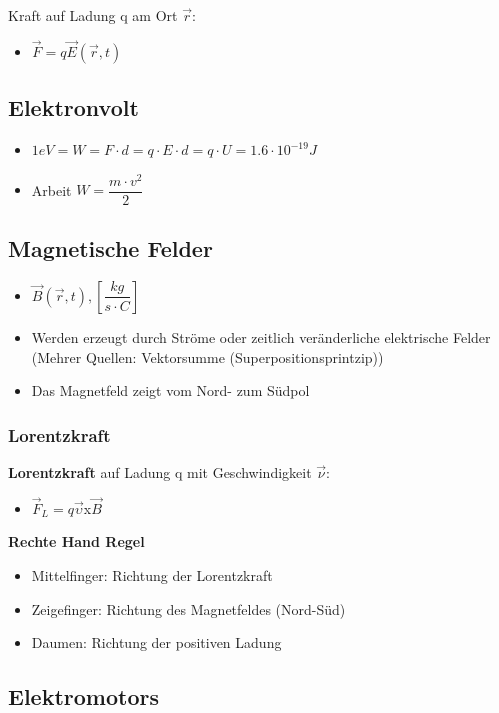 \documentclass[6pt,a4paper]{scrartcl}
\begin{document}
\begin{multicols*}{4}
\begin{itemize}
				\end{itemize}
				Kraft auf Ladung q am Ort 
				$\overrightarrow{r}$:
				\begin{itemize}\itemsep0pt
					\item $\overrightarrow{F}=q\overrightarrow{E}(\overrightarrow{r},t)$
				\end{itemize}
			\subsection{Elektronvolt}
				\begin{itemize}\itemsep0pt
					\item $1 eV = W = F \cdot d =q\cdot E\cdot d=q \cdot U= 1.6\cdot10^{-19}J$
					\item Arbeit $W=\dfrac{m\cdot v^{2}}{2}$
				\end{itemize}
			\subsection{Magnetische Felder}
				\begin{itemize}\itemsep0pt
					\item $\overrightarrow{B}(\overrightarrow{r},t), [\dfrac{kg}{s\cdot C}]$
					\item Werden erzeugt durch Ströme oder zeitlich veränderliche elektrische Felder (Mehrer Quellen: Vektorsumme (Superpositionsprintzip))
					\item Das Magnetfeld zeigt vom Nord- zum Südpol
				\end{itemize}
				
				\subsubsection{Lorentzkraft}				
				
					\textbf{Lorentzkraft} auf Ladung q mit Geschwindigkeit $\overrightarrow{\nu}$:
					\begin{itemize}\itemsep0pt
						\item $\overrightarrow{F}_{L}=q\overrightarrow{\upsilon} $x$ \overrightarrow{B}$
					\end{itemize}	
					
					\textbf{Rechte Hand Regel}
					\begin{itemize}\itemsep0pt
						\item Mittelfinger: Richtung der Lorentzkraft
						\item Zeigefinger: Richtung des Magnetfeldes (Nord-Süd)
						\item Daumen: Richtung der positiven Ladung
					\end{itemize}					
				
			\subsection{Elektromotors}

\end{multicols*}

\end{document}
